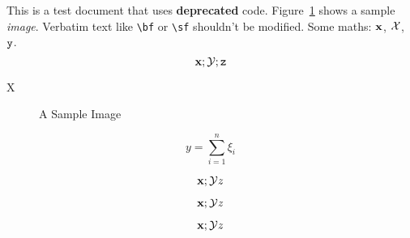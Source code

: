 \documentclass[12pt,a4paper]{article}
\begin{document}
This is a test {\sf document} that uses {\bf deprecated} code.
Figure~\ref{fig:sample} shows a sample {\it image}.
  Verbatim text like \verb|\bf| or \verb|\sf| shouldn't be
modified. Some maths: $\bf x$, \begin{math}\cal X\end{math},
\(\tt y\).
\[
  {\bf x}; {\cal Y}; {\tt z}
\]

   \centerline{X}

\begin{figure}
\centerline{}
\caption{A Sample Image}
\label{fig:sample}
\end{figure}

$$y = \sum_{i=1}^n \xi_i$$

$${\bf x}; {\cal Y} {\it z}$$

\begin{displaymath}
{\bf x}; {\cal Y} {\it z}
\end{displaymath}

\begin{equation}
{\bf x}; {\cal Y} {\it z}
\end{equation}
\end{document}
